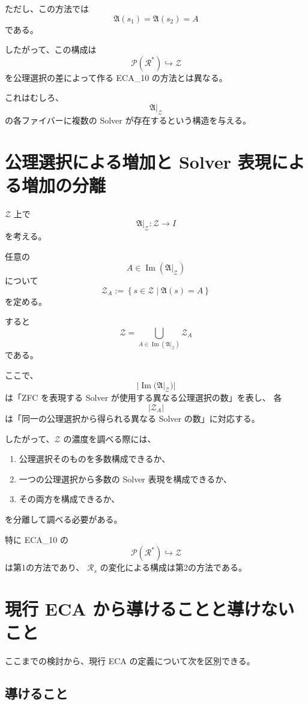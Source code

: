 \documentclass[a4paper,11pt]{jsarticle}
\newcommand{\Sel}{I}
\begin{document}
ただし、この方法では
\[
\mathfrak{A}(s_1)=\mathfrak{A}(s_2)=A
\]
である。

したがって、この構成は
\[
\mathcal{P}(\mathcal{R}^{*})\hookrightarrow\mathcal{Z}
\]
を公理選択の差によって作る ECA_10 の方法とは異なる。

これはむしろ、
\[
\mathfrak{A}|_{\mathcal{Z}}
\]
の各ファイバーに複数の Solver が存在するという構造を与える。

\section{公理選択による増加と Solver 表現による増加の分離}

$\mathcal{Z}$ 上で
\[
\mathfrak{A}|_{\mathcal{Z}}:
\mathcal{Z}\longrightarrow\Sel
\]
を考える。

任意の
\[
A\in\operatorname{Im}(\mathfrak{A}|_{\mathcal{Z}})
\]
について
\[
\mathcal{Z}_A
:=
\left\{
s\in\mathcal{Z}
\mid
\mathfrak{A}(s)=A
\right\}
\]
を定める。

すると
\[
\mathcal{Z}
=
\bigcup_{A\in\operatorname{Im}(\mathfrak{A}|_{\mathcal{Z}})}
\mathcal{Z}_A
\]
である。

ここで、
\[
|\operatorname{Im}(\mathfrak{A}|_{\mathcal{Z}})|
\]
は「ZFC を表現する Solver が使用する異なる公理選択の数」を表し、
各
\[
|\mathcal{Z}_A|
\]
は「同一の公理選択から得られる異なる Solver の数」に対応する。

したがって、$\mathcal{Z}$ の濃度を調べる際には、

\begin{enumerate}
\item 公理選択そのものを多数構成できるか、
\item 一つの公理選択から多数の Solver 表現を構成できるか、
\item その両方を構成できるか、
\end{enumerate}

を分離して調べる必要がある。

特に ECA_10 の
\[
\mathcal{P}(\mathcal{R}^{*})\hookrightarrow\mathcal{Z}
\]
は第1の方法であり、
$\mathcal{R}_s$ の変化による構成は第2の方法である。

\section{現行 ECA から導けることと導けないこと}

ここまでの検討から、現行 ECA の定義について次を区別できる。

\subsection{導けること}
\end{document}
